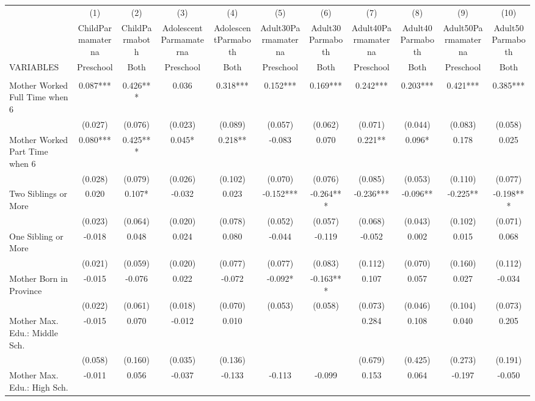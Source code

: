 \begin{tabular}{lcccccccccc} \hline
 & (1) & (2) & (3) & (4) & (5) & (6) & (7) & (8) & (9) & (10) \\
 & ChildParmamaterna & ChildParmaboth & AdolescentParmamaterna & AdolescentParmaboth & Adult30Parmamaterna & Adult30Parmaboth & Adult40Parmamaterna & Adult40Parmaboth & Adult50Parmamaterna & Adult50Parmaboth \\
VARIABLES & Preschool & Both & Preschool & Both & Preschool & Both & Preschool & Both & Preschool & Both \\ \hline
 &  &  &  &  &  &  &  &  &  &  \\
Mother Worked Full Time when 6 & 0.087*** & 0.426*** & 0.036 & 0.318*** & 0.152*** & 0.169*** & 0.242*** & 0.203*** & 0.421*** & 0.385*** \\
 & (0.027) & (0.076) & (0.023) & (0.089) & (0.057) & (0.062) & (0.071) & (0.044) & (0.083) & (0.058) \\
Mother Worked Part Time when 6 & 0.080*** & 0.425*** & 0.045* & 0.218** & -0.083 & 0.070 & 0.221** & 0.096* & 0.178 & 0.025 \\
 & (0.028) & (0.079) & (0.026) & (0.102) & (0.070) & (0.076) & (0.085) & (0.053) & (0.110) & (0.077) \\
Two Siblings or More & 0.020 & 0.107* & -0.032 & 0.023 & -0.152*** & -0.264*** & -0.236*** & -0.096** & -0.225** & -0.198*** \\
 & (0.023) & (0.064) & (0.020) & (0.078) & (0.052) & (0.057) & (0.068) & (0.043) & (0.102) & (0.071) \\
One Sibling or More & -0.018 & 0.048 & 0.024 & 0.080 & -0.044 & -0.119 & -0.052 & 0.002 & 0.015 & 0.068 \\
 & (0.021) & (0.059) & (0.020) & (0.077) & (0.077) & (0.083) & (0.112) & (0.070) & (0.160) & (0.112) \\
Mother Born in Province & -0.015 & -0.076 & 0.022 & -0.072 & -0.092* & -0.163*** & 0.107 & 0.057 & 0.027 & -0.034 \\
 & (0.022) & (0.061) & (0.018) & (0.070) & (0.053) & (0.058) & (0.073) & (0.046) & (0.104) & (0.073) \\
Mother Max. Edu.: Middle Sch. & -0.015 & 0.070 & -0.012 & 0.010 &  &  & 0.284 & 0.108 & 0.040 & 0.205 \\
 & (0.058) & (0.160) & (0.035) & (0.136) &  &  & (0.679) & (0.425) & (0.273) & (0.191) \\
Mother Max. Edu.: High Sch. & -0.011 & 0.056 & -0.037 & -0.133 & -0.113 & -0.099 & 0.153 & 0.064 & -0.197 & -0.050 \\

\end{tabular}
